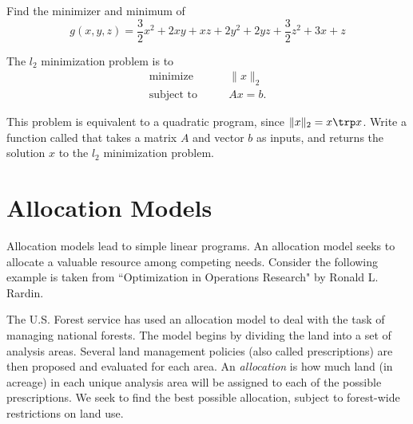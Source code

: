 \begin{problem}
Find the minimizer and minimum of
\begin{equation*}
g(x,y,z) = \frac{3}{2}x^2 +2xy + xz+ 2y^2 +2yz+\frac{3}{2}z^2+3x + z
\end{equation*}
\begin{comment}
\begin{equation}
f(x) = \frac{1}{2}x\trp Qx - x\trp p
\end{equation}
where

\begin{center}
$Q =
\begin{bmatrix}
3 & 2 & 1\\
2 & 4 & 2\\
1 & 2 & 3\\
\end{bmatrix}
$
and $p =
\begin{bmatrix}
3\\
0\\
1\\
\end{bmatrix}
$
\end{center}
\end{comment}

\end{problem}


\begin{problem}
The $l_2$ minimization problem is to
\begin{align*}
\text{minimize}\qquad &\|x\|_2\\
\text{subject to} \qquad &Ax = b.
\end{align*}

This problem is equivalent to a quadratic program, since $\|x\|_2 = x\trp x$.
Write a function called  that takes a matrix $A$ and vector $b$ as inputs, and returns the solution $x$ to the $l_2$ minimization problem.
\end{problem}

\section*{Allocation Models}
Allocation models lead to simple linear programs. An allocation model seeks to allocate a valuable resource among competing needs. Consider the following example is taken from ``Optimization in Operations Research" by Ronald L. Rardin. %

The U.S. Forest service has used an allocation model to deal with the task of managing national forests. 
The model begins by dividing the land into a set of analysis areas. Several land management policies (also 
called prescriptions) are then proposed and evaluated for each area. 
An \emph{allocation} is how much land (in acreage) in each unique analysis area will be assigned to each of the possible prescriptions.
We seek to find the best possible allocation, subject to forest-wide restrictions on land use.

